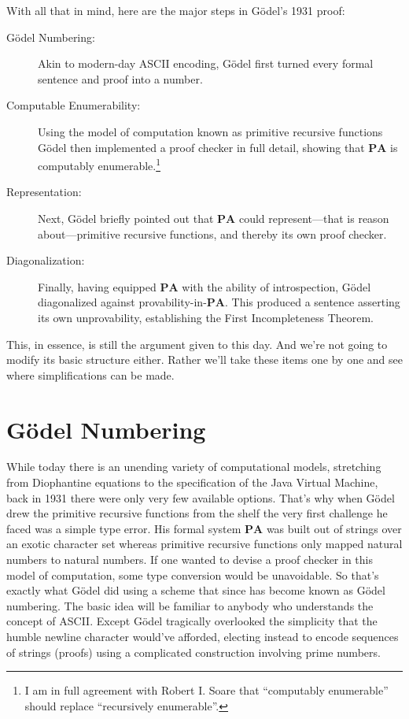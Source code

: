\documentclass{article}
\theoremstyle{customstyle}
\newcommand{\PA}{\mathbf{PA}}
\begin{document}
With all that in mind, here are the major steps in Gödel's 1931 proof:
\begin{description}
\item[Gödel Numbering:] Akin to modern-day ASCII encoding, Gödel first turned every formal sentence and proof into a number.
\item[Computable Enumerability:] Using the model of computation known as primitive recursive functions Gödel then implemented a proof checker in full detail, showing that $\PA$ is computably enumerable.\footnote{I am in full agreement with Robert I. Soare that ``computably enumerable'' should replace ``recursively enumerable''.}
\item[Representation:] Next, Gödel briefly pointed out that $\PA$ could represent---that is reason about---primitive recursive functions, and thereby its own proof checker.
\item[Diagonalization:] Finally, having equipped $\PA$ with the ability of introspection, Gödel diagonalized against provability-in-$\PA$. This produced a sentence asserting its own unprovability, establishing the First Incompleteness Theorem.
\end{description}

This, in essence, is still the argument given to this day. And we're not going to modify its basic structure either. Rather we'll take these items one by one and see where simplifications can be made.

\section{Gödel Numbering}

While today there is an unending variety of computational models, stretching from Diophantine equations to the specification of the Java Virtual Machine, back in 1931 there were only very few available options. That's why when Gödel drew the primitive recursive functions from the shelf the very first challenge he faced was a simple type error. His formal system $\PA$ was built out of strings over an exotic character set whereas primitive recursive functions only mapped natural numbers to natural numbers. If one wanted to devise a proof checker in this model of computation, some type conversion would be unavoidable. So that's exactly what Gödel did using a scheme that since has become known as Gödel numbering. The basic idea will be familiar to anybody who understands the concept of ASCII. Except Gödel tragically overlooked the simplicity that the humble newline character would've afforded, electing instead to encode sequences of strings (proofs) using a complicated construction involving prime numbers.
\end{document}

